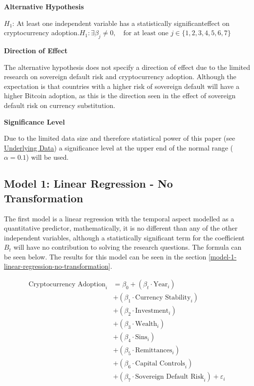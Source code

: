 \documentclass[
]{article}
\begin{document}
\textbf{Alternative Hypothesis}

\(H_1\): At least one independent variable has a statistically significant\newline effect on cryptocurrency adoption.\newline\newline \(H_1: \exists \beta_j \neq 0, \quad \text{for at least one } j \in \{1,2,3,4,5,6,7\}\)

\textbf{Direction of Effect}

The alternative hypothesis does not specify a direction of effect due to the limited research on sovereign default risk and cryptocurrency adoption. Although the expectation is that countries with a higher risk of sovereign default will have a higher Bitcoin adoption, as this is the direction seen in the effect of sovereign default risk on currency substitution.

\textbf{Significance Level}

Due to the limited data size and therefore statistical power of this paper (see \hyperref[underlying-data]{Underlying Data}) a significance level at the upper end of the normal range (\(\alpha=0.1\)) will be used.

\subsection{Model 1: Linear Regression - No Transformation}\label{model-1-linear-regression---no-transformation}

The first model is a linear regression with the temporal aspect modelled as a quantitative predictor, mathematically, it is no different than any of the other independent variables, although a statistically significant term for the coefficient \(B_t\) will have no contribution to solving the research questions. The formula can be seen below. The results for this model can be seen in the section \ref{model-1-linear-regression-no-transformation}.

\begin{align*} 
\text{Cryptocurrency Adoption}_{i} &= \beta_0 + (\beta_t \cdot \text{Year}_{i}) \\ 
&+ (\beta_1 \cdot \text{Currency Stability}_{i}) \\ 
&+ (\beta_2 \cdot \text{Investment}_{i}) \\ 
&+ (\beta_3 \cdot \text{Wealth}_{i}) \\
&+ (\beta_4 \cdot \text{Sins}_{i}) \\
&+ (\beta_5 \cdot \text{Remittances}_{i}) \\
&+ (\beta_6 \cdot \text{Capital Controls}_{i}) \\
&+ (\beta_7 \cdot \text{Sovereign Default Risk}_{i}) + \varepsilon_{i} 
\end{align*}
\end{document}
